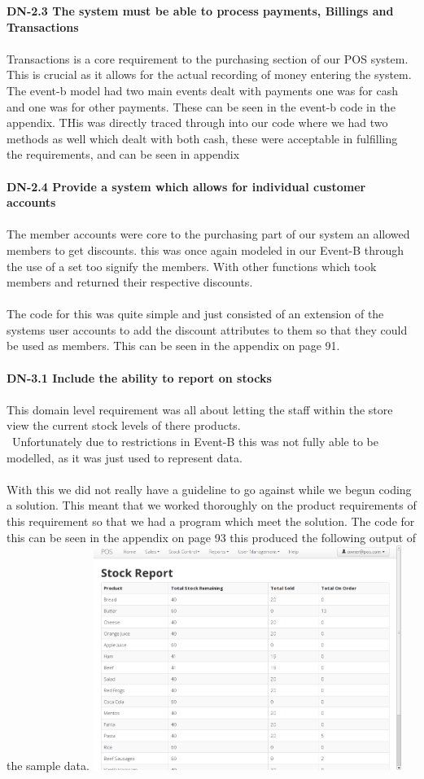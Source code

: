 \documentclass[a4paper]{article}
\begin{document}
\textbf{DN-2.3 The system must be able to process payments, Billings and Transactions}
\\\\
Transactions is a core requirement to the purchasing section of our POS system. This is crucial as it allows for the actual recording of money entering the system. The event-b model had two main events dealt with payments one was for cash and one was for other payments. These can be seen in the event-b code in the appendix. THis was directly traced through into our code where we had two methods as well which dealt with both cash, these were acceptable in fulfilling the requirements, and can be seen in appendix
\\\\
\textbf{DN-2.4 Provide a system which allows for individual customer accounts}
\\\\
The member accounts were core to the purchasing part of our system an allowed members to get discounts. this was once again modeled in our Event-B through the use of a set too signify the members. With other functions which took members and returned their respective discounts.
\\\\
The code for this was quite simple and just consisted of an extension of the systems user accounts to add the discount attributes to them so that they could be used as members.  This can be seen in the appendix on page 91. 
\\\\
\textbf{DN-3.1 Include the ability to report on stocks}
\\\\
This domain level requirement  was all about letting the staff within the store view the current stock levels of there products. 
\\\
Unfortunately due to restrictions in Event-B this was not fully able to be modelled, as it was just used to represent data. 
\\\\
With this we did not really have a guideline to go against while we begun coding a solution. This meant that we worked thoroughly on the product requirements of this requirement so that we had a program which meet the solution. The code for this can be seen in the appendix on page 93  this produced the following output of the sample data. \includegraphics[width=10cm]{d4.png} 
\end{document}
